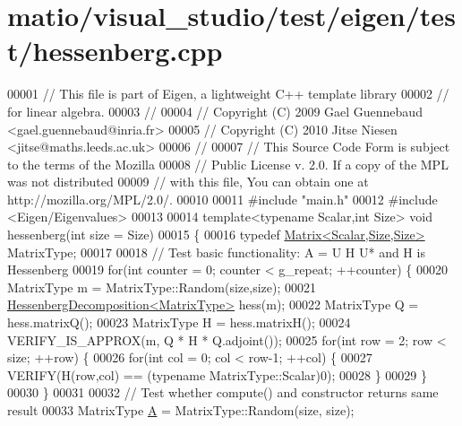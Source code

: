 \hypertarget{matio_2visual__studio_2test_2eigen_2test_2hessenberg_8cpp_source}{}\section{matio/visual\+\_\+studio/test/eigen/test/hessenberg.cpp}
\label{matio_2visual__studio_2test_2eigen_2test_2hessenberg_8cpp_source}

\begin{DoxyCode}
00001 \textcolor{comment}{// This file is part of Eigen, a lightweight C++ template library}
00002 \textcolor{comment}{// for linear algebra.}
00003 \textcolor{comment}{//}
00004 \textcolor{comment}{// Copyright (C) 2009 Gael Guennebaud <gael.guennebaud@inria.fr>}
00005 \textcolor{comment}{// Copyright (C) 2010 Jitse Niesen <jitse@maths.leeds.ac.uk>}
00006 \textcolor{comment}{//}
00007 \textcolor{comment}{// This Source Code Form is subject to the terms of the Mozilla}
00008 \textcolor{comment}{// Public License v. 2.0. If a copy of the MPL was not distributed}
00009 \textcolor{comment}{// with this file, You can obtain one at http://mozilla.org/MPL/2.0/.}
00010 
00011 \textcolor{preprocessor}{#include "main.h"}
00012 \textcolor{preprocessor}{#include <Eigen/Eigenvalues>}
00013 
00014 \textcolor{keyword}{template}<\textcolor{keyword}{typename} Scalar,\textcolor{keywordtype}{int} Size> \textcolor{keywordtype}{void} hessenberg(\textcolor{keywordtype}{int} size = Size)
00015 \{
00016   \textcolor{keyword}{typedef} \hyperlink{group___core___module_class_eigen_1_1_matrix}{Matrix<Scalar,Size,Size>} MatrixType;
00017 
00018   \textcolor{comment}{// Test basic functionality: A = U H U* and H is Hessenberg}
00019   \textcolor{keywordflow}{for}(\textcolor{keywordtype}{int} counter = 0; counter < g\_repeat; ++counter) \{
00020     MatrixType m = MatrixType::Random(size,size);
00021     \hyperlink{group___eigenvalues___module}{HessenbergDecomposition<MatrixType>} hess(m);
00022     MatrixType Q = hess.matrixQ();
00023     MatrixType H = hess.matrixH();
00024     VERIFY\_IS\_APPROX(m, Q * H * Q.adjoint());
00025     \textcolor{keywordflow}{for}(\textcolor{keywordtype}{int} row = 2; row < size; ++row) \{
00026       \textcolor{keywordflow}{for}(\textcolor{keywordtype}{int} col = 0; col < row-1; ++col) \{
00027     VERIFY(H(row,col) == (\textcolor{keyword}{typename} MatrixType::Scalar)0);
00028       \}
00029     \}
00030   \}
00031 
00032   \textcolor{comment}{// Test whether compute() and constructor returns same result}
00033   MatrixType \hyperlink{group___core___module_class_eigen_1_1_matrix}{A} = MatrixType::Random(size, size);

\end{DoxyCode}
